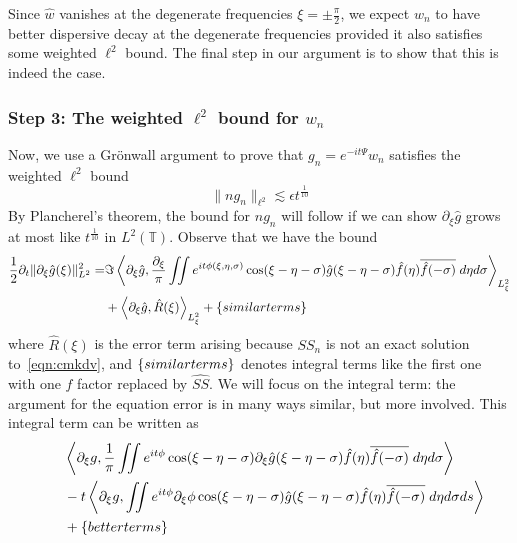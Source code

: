 \documentclass[letterpaper, reqno,final]{amsart}
\newcommand{\bbT}{\mathbb{T}}
\newcommand{\fhPi}{\frac{\pi}{2}}
\newcommand{\mSS}{\mathit{SS}}
\newcommand{\discrAvg}{\Psi}
\newcommand{\invLinProp}[1][t]{e^{-i#1\discrAvg}}
\newcommand{\btext}[1]{\left\{\textup{#1}\right\}}
\newcommand{\bsim}{\btext{similar terms}}
\begin{document}
Since $\hat{w}$ vanishes at the degenerate frequencies $\xi = \pm \fhPi$, we expect $w_n$ to have better dispersive decay at the degenerate frequencies provided it also satisfies some weighted $\ell^2$ bound.  The final step in our argument is to show that this is indeed the case.

\subsubsection{Step 3: The weighted \texorpdfstring{$\ell^2$}{l2} bound for \texorpdfstring{$w_n$}{w\_n}}

Now, we use a Gr\"onwall argument to prove that $g_n = \invLinProp w_n$ satisfies the weighted $\ell^2$ bound
\begin{equation*}
    \lVert n g_n \rVert_{\ell^2} \lesssim \epsilon t^{\frac{1}{10}}
\end{equation*}
By Plancherel's theorem, the bound for $ng_n$ will follow if we can show $\partial_\xi \hat{g}$ grows at most like $t^{\frac{1}{10}}$ in $L^2(\bbT)$.  Observe that we have the bound
\begin{equation}\begin{split}
    \frac{1}{2}\partial_t \lVert \partial_\xi \hat g(\xi)\rVert_{L^2}^2 =& \Im\left\langle\partial_\xi \hat{g}, \frac{\partial_\xi}{\pi} \iint e^{it\phi(\xi,\eta,\sigma)}\cos(\xi - \eta - \sigma) \hat g(\xi-\eta-\sigma)\hat f(\eta) \overline{\hat f(-\sigma)}\;d\eta d\sigma \right\rangle_{L^2_\xi}\\
    &+ \left\langle\partial_\xi \hat{g},\hat{R}(\xi) \right\rangle_{L^2_\xi} + \bsim
\end{split}\end{equation}
where $\hat{R}(\xi)$ is the error term arising because $\mSS_n$ is not an exact solution to~\eqref{eqn:cmkdv}, and $\bsim$ denotes integral terms like the first one with one $\hat{f}$ factor replaced by $\widehat{\mSS}$.  We will focus on the integral term: the argument for the equation error is in many ways similar, but more involved.  This integral term can be written as
\begin{equation}\label{eqn:intro-duhamel-division}\begin{split}
    &\left\langle \partial_\xi g, \frac{1}{\pi} \iint e^{it\phi} \cos(\xi - \eta - \sigma) \partial_\xi \hat g(\xi-\eta-\sigma)\hat f(\eta) \overline{\hat f(-\sigma)}\;d\eta d\sigma \right\rangle\\
    \qquad&-t\left\langle \partial_\xi g, \iint e^{it\phi} \partial_\xi \phi \cos(\xi - \eta - \sigma) \hat g(\xi-\eta-\sigma)\hat f(\eta) \overline{\hat f(-\sigma)}\;d\eta d\sigma ds\right\rangle\\
    \qquad &+ \btext{better terms}
\end{split}\end{equation}
\end{document}
